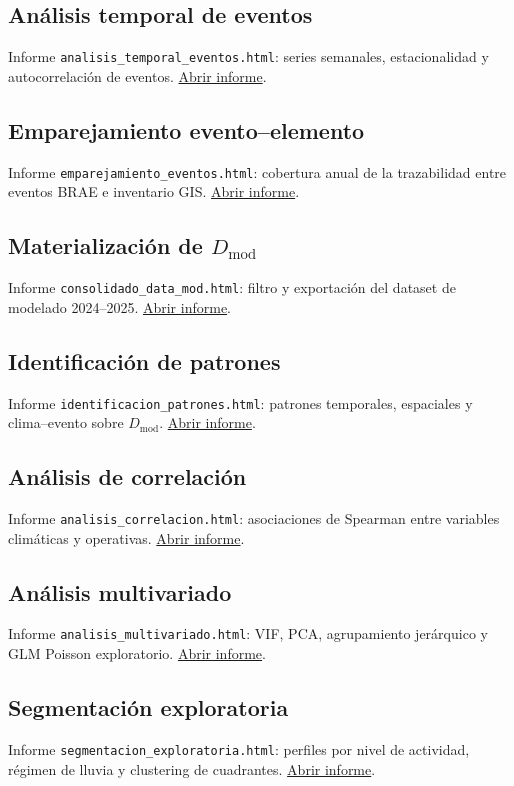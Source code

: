 \subsection{Análisis temporal de eventos}
\label{app:html-temporal}
Informe \texttt{analisis\_temporal\_eventos.html}: series semanales, estacionalidad y autocorrelación de eventos.
\href{\urlanalisistemporal}{Abrir informe}.

\subsection{Emparejamiento evento--elemento}
\label{app:html-emparejamiento}
Informe \texttt{emparejamiento\_eventos.html}: cobertura anual de la trazabilidad entre eventos BRAE e inventario GIS.
\href{\urlemparejamientoeventos}{Abrir informe}.

\subsection{Materialización de $D_{\mathrm{mod}}$}
\label{app:html-datamod}
Informe \texttt{consolidado\_data\_mod.html}: filtro y exportación del dataset de modelado 2024--2025.
\href{\urlconsolidadodatamod}{Abrir informe}.

\subsection{Identificación de patrones}
\label{app:html-patrones}
Informe \texttt{identificacion\_patrones.html}: patrones temporales, espaciales y clima--evento sobre $D_{\mathrm{mod}}$.
\href{\urlidentificacionpatrones}{Abrir informe}.

\subsection{Análisis de correlación}
\label{app:html-correlacion}
Informe \texttt{analisis\_correlacion.html}: asociaciones de Spearman entre variables climáticas y operativas.
\href{\urlanalisisCorrelacion}{Abrir informe}.

\subsection{Análisis multivariado}
\label{app:html-multivariado}
Informe \texttt{analisis\_multivariado.html}: VIF, PCA, agrupamiento jerárquico y GLM Poisson exploratorio.
\href{\urlanalisisMultivariado}{Abrir informe}.

\subsection{Segmentación exploratoria}
\label{app:html-segmentacion}
Informe \texttt{segmentacion\_exploratoria.html}: perfiles por nivel de actividad, régimen de lluvia y clustering de cuadrantes.
\href{\urlsegmentacionexploratoria}{Abrir informe}.

